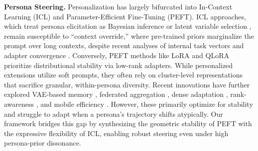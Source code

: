 \noindent \textbf{Persona Steering.}
Personalization has largely bifurcated into In-Context Learning (ICL) and Parameter-Efficient Fine-Tuning (PEFT). ICL approaches, which treat persona elicitation as Bayesian inference or latent variable selection \citep{Dathathri2020Plug,cho2025saeicl,choi2024picle}, remain susceptible to ``context override,'' where pre-trained priors marginalize the prompt over long contexts, despite recent analyses of internal task vectors \citep{han2025emergence} and adapter convergence \citep{kim2025lora_training}. Conversely, PEFT methods like LoRA \citep{hu2022lora} and QLoRA \citep{dettmers2023qlora} prioritize distributional stability via low-rank adapters. While personalized extensions \citep{tan2024democratizing} utilize soft prompts, they often rely on cluster-level representations that sacrifice granular, within-persona diversity. Recent innovations have further explored VAE-based memory \citep{liu2025palace}, federated aggregation \citep{singhal2025fedexlora}, dense adaptation \citep{mu2025denselora}, rank-awareness \citep{gu2025beamlora}, and mobile efficiency \citep{li2025mobilora}. However, these primarily optimize for stability and struggle to adapt when a persona's trajectory shifts atypically. Our framework bridges this gap by synthesizing the geometric stability of PEFT with the expressive flexibility of ICL, enabling robust steering even under high persona-prior dissonance.





